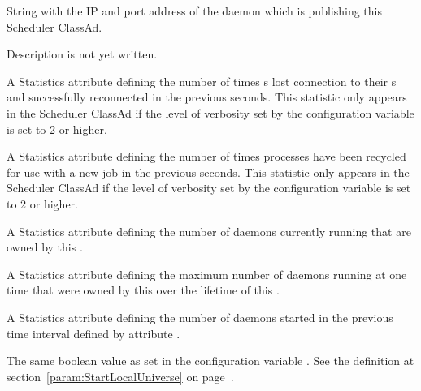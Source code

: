 \begin{description}
\item[\AdAttr{ScheddIpAddr}:] String with the IP and port address of the
 daemon which is publishing this Scheduler ClassAd.

\item[\AdAttr{ServerTime}:] Description is not yet written.

\item[\AdAttr{ShadowsReconnections}:] A Statistics attribute defining
  the number of times s lost 
  connection to their s and successfully reconnected
  in the previous  seconds.
  This statistic only appears in the Scheduler ClassAd if the level of
  verbosity set by the configuration variable 
  is set to 2 or higher.

\item[\AdAttr{ShadowsRecycled}:] A Statistics attribute defining
  the number of times  processes have been 
  recycled for use with a new job
  in the previous  seconds.
  This statistic only appears in the Scheduler ClassAd if the level of
  verbosity set by the configuration variable 
  is set to 2 or higher.

\item[\AdAttr{ShadowsRunning}:] A Statistics attribute defining
  the number of  daemons currently running 
  that are owned by this .

\item[\AdAttr{ShadowsRunningPeak}:] A Statistics attribute defining
  the maximum number of  daemons running at one time
  that were owned by this  over the lifetime of 
  this .

\item[\AdAttr{ShadowsStarted}:] A Statistics attribute defining
  the number of  daemons started
  in the previous time interval defined by attribute .

\item[\AdAttr{StartLocalUniverse}:] The same boolean value as set in the
  configuration variable .
  See the definition at section~\ref{param:StartLocalUniverse} on
  page~\pageref{param:StartLocalUniverse}.


\end{description}
